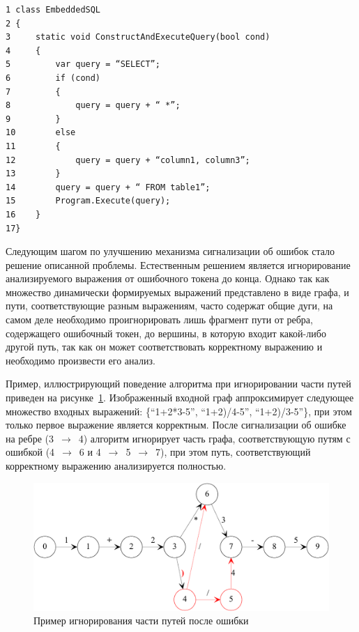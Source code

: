 \begin{verbatim}
1 class EmbeddedSQL 
2 {
3     static void ConstructAndExecuteQuery(bool cond)
4     {
5         var query = “SELECT”;
6         if (cond)
7         {
8             query = query + “ *”; 
9         }
10        else
11        {
12            query = query + “column1, column3”;
13        }
14        query = query + “ FROM table1”;
15        Program.Execute(query);
16    }
17}
\end{verbatim}

Следующим шагом по улучшению механизма сигнализации об ошибок стало решение 
описанной проблемы. Естественным решением является игнорирование анализируемого 
выражения от ошибочного токена до конца. Однако так как множество динамически 
формируемых выражений представлено в виде графа, и пути, соответствующие разным 
выражениям, часто содержат общие дуги, на самом деле необходимо проигнорировать 
лишь фрагмент пути от ребра, содержащего ошибочный токен, до вершины, в которую 
входит какой-либо другой путь, так как он может соответствовать корректному 
выражению и необходимо произвести его анализ.

Пример, иллюстрирующий поведение алгоритма при игнорировании части путей приведен 
на рисунке~\ref{ignor}. Изображенный входной граф аппроксимирует следующее множество входных 
выражений: \{“1+2*3-5”, “1+2)/4-5”, “1+2)/3-5”\}, при этом только первое выражение 
является корректным. После сигнализации об ошибке на ребре (3~$\to$~4) алгоритм 
игнорирует часть графа, соответствующую путям с ошибкой (4~$\to$~6 и 4~$\to$~5~$\to$~7), 
при этом путь, соответствующий корректному выражению анализируется полностью.

\begin{figure}[h]
 \label{ignor}
 \centering
 \includegraphics[width=\linewidth]{Verbitskaia/IgnoringPaths.pdf}
 \caption{Пример игнорирования части путей после ошибки}
 \label{ignor}
\end{figure}

